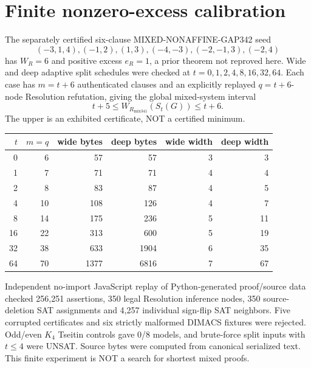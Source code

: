 \documentclass[11pt]{article}
\begin{document}
\section*{Finite nonzero-excess calibration}
The separately certified six-clause MIXED-NONAFFINE-GAP342 seed
\[
(-3,1,4),(-1,2),(1,3),(-4,-3),(-2,-1,3),(-2,4)
\]
has $W_R=6$ and positive excess $e_R=1$, a prior theorem not reproved here. Wide and deep adaptive split schedules were checked at $t=0,1,2,4,8,16,32,64$. Each case has $m=t+6$ authenticated clauses and an explicitly replayed $q=t+6$-node Resolution refutation, giving the global mixed-system interval
\[
\boxed{t+5\le W_{R_{\mathrm{mix341}}}(S_t(G))\le t+6.}
\]
The upper is an exhibited certificate, NOT a certified minimum.
\begin{center}\begin{tabular}{rrrrrr}\toprule
$t$&$m=q$&wide bytes&deep bytes&wide width&deep width\\\midrule
0&6&57&57&3&3\\
1&7&71&71&4&4\\
2&8&83&87&4&5\\
4&10&108&126&4&7\\
8&14&175&236&5&11\\
16&22&313&600&5&19\\
32&38&633&1904&6&35\\
64&70&1377&6816&7&67\\\bottomrule
\end{tabular}\end{center}
Independent no-import JavaScript replay of Python-generated proof/source data checked 256,251 assertions, 350 legal Resolution inference nodes, 350 source-deletion SAT assignments and 4,257 individual sign-flip SAT neighbors. Five corrupted certificates and six strictly malformed DIMACS fixtures were rejected. Odd/even $K_4$ Tseitin controls gave 0/8 models, and brute-force split inputs with $t\le4$ were UNSAT. Source bytes were computed from canonical serialized text. This finite experiment is NOT a search for shortest mixed proofs.
\end{document}
